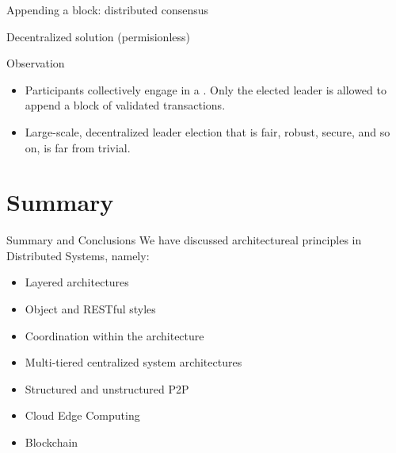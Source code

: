\begin{slide}{Appending a block: distributed consensus}
  \begin{block}{Decentralized solution (permisionless)}
    \begin{centerfig}
    \end{centerfig}
  \end{block}
  \begin{block}{Observation}
    \begin{itemize}\firmlist
    \item Participants collectively engage in a . Only the elected leader is allowed to
      append a block of validated transactions.
    \item Large-scale, decentralized leader election that is fair, robust, secure, and so on, is far from
      trivial. 
    \end{itemize}
    
  \end{block}
\end{slide}
\section{Summary}
\begin{slide}{Summary and Conclusions}
We have discussed architectureal principles
in Distributed Systems, namely:
\begin{itemize}
  \item Layered architectures
  \item Object and RESTful styles
  \item Coordination within the architecture
  \item Multi-tiered centralized system architectures
  \item Structured and unstructured P2P
  \item Cloud Edge Computing
  \item Blockchain
\end{itemize}  
\end{slide}
